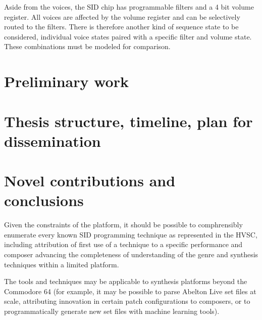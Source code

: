 \documentclass[10pt]{article}
\begin{document}
\begin{multicols*}{2}
  Aside from the voices, the SID chip has programmable filters and
  a 4 bit volume register. All voices are affected by the volume
  register and can be selectively routed to the filters. There is
  therefore another kind of sequence state to be considered,
  individual voice states paired with a specific filter and volume
  state. These combinations must be modeled for comparison.

\section{Preliminary work}

\section{Thesis structure, timeline, plan for dissemination}

\section{Novel contributions and conclusions}

Given the constraints of the platform, it should be possible to
comphrensibly enumerate every known SID programming technique as
represented in the HVSC, including attribution of first use of a
technique to a specific performance and composer advancing the
completeness of understanding of the genre and synthesis techniques
within a limited platform.

The tools and techniques may be applicable to synthesis platforms
beyond the Commodore 64 (for example, it may be possible to parse
Abelton Live set files at scale, attributing innovation in certain
patch configurations to composers, or to programmatically
generate new set files with machine learning tools).






\end{multicols*}
\end{document}
